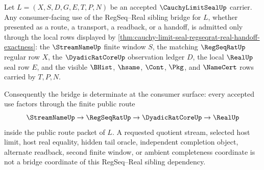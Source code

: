 \begin{theorem}
\label{thm:cauchy-limit-seal-regseq-real-bridge-determinacy}
Let $L=(X,S,D,G,E,T,P,N)$ be an accepted $\CauchyLimitSealUp$ carrier. Any consumer-facing use of the RegSeq--Real sibling bridge for $L$, whether presented as a route, a transport, a readback, or a handoff, is admitted only through the local rows displayed by \autoref{thm:cauchy-limit-seal-regseqrat-real-handoff-exactness}: the $\StreamNameUp$ finite window $S$, the matching $\RegSeqRatUp$ regular row $X$, the $\DyadicRatCoreUp$ observation ledger $D$, the local $\RealUp$ seal row $E$, and the visible $\BHist$, $\hsame$, $\Cont$, $\Pkg$, and $\NameCert$ rows carried by $T,P,N$.

Consequently the bridge is determinate at the consumer surface: every accepted use factors through the finite public route
$$
\StreamNameUp \to \RegSeqRatUp \to \DyadicRatCoreUp \to \RealUp
$$
inside the public route packet of $L$. A requested quotient stream, selected host limit, host real equality, hidden tail oracle, independent completion object, alternate readback, second finite window, or ambient completeness coordinate is not a bridge coordinate of this RegSeq--Real sibling dependency.
\end{theorem}

